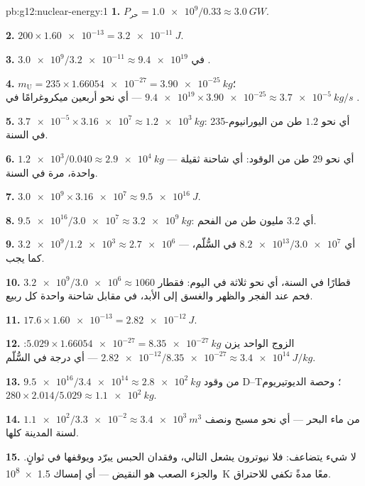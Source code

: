 \begin{solution}{pb:g12:nuclear-energy:1}
\textbf{1.} $P_{\text{حر}} = \num{1.0e9}/0.33 \approx \qty{3.0}{GW}$.

\textbf{2.} $200 \times \num{1.60e-13} = \qty{3.2e-11}{J}$.

\textbf{3.} $\num{3.0e9}/\num{3.2e-11} \approx \num{9.4e19}$ 
في .

\textbf{4.} $m_{\mathrm U} = 235 \times \num{1.66054e-27} =
\qty{3.90e-25}{kg}$؛ $\num{9.4e19} \times \num{3.90e-25} \approx
\qty{3.7e-5}{kg/s}$ --- أي نحو أربعين ميكروغرامًا في .

\textbf{5.} $\num{3.7e-5} \times \num{3.16e7} \approx \qty{1.2e3}{kg}$:
أي نحو $1.2$ طن من اليورانيوم-235 في السنة.

\textbf{6.} $\num{1.2e3}/0.040 \approx \qty{2.9e4}{kg}$ --- أي نحو $29$
طن من الوقود: أي شاحنة ثقيلة واحدة، مرة في السنة.

\textbf{7.} $\num{3.0e9} \times \num{3.16e7} \approx \qty{9.5e16}{J}$.

\textbf{8.} $\num{9.5e16}/\num{3.0e7} \approx \qty{3.2e9}{kg}$: أي $3.2$
مليون طن من الفحم.

\textbf{9.} $\num{3.2e9}/\num{1.2e3} \approx \num{2.7e6}$ --- أي
$\num{8.2e13}/\num{3.0e7}$ في السُّلّم، كما يجب.

\textbf{10.} $\num{3.2e9}/\num{3.0e6} \approx 1060$ قطارًا في السنة،
أي نحو ثلاثة في اليوم: فقطار فحم عند الفجر والظهر والغسق إلى الأبد،
في مقابل شاحنة واحدة كل ربيع.

\textbf{11.} $17.6 \times \num{1.60e-13} = \qty{2.82e-12}{J}$.

\textbf{12.} الزوج الواحد يزن $5.029 \times \num{1.66054e-27} =
\qty{8.35e-27}{kg}$: $\num{2.82e-12}/\num{8.35e-27} \approx
\qty{3.4e14}{J/kg}$ --- أي درجة  في السُّلّم.

\textbf{13.} $\num{9.5e16}/\num{3.4e14} \approx \qty{2.8e2}{kg}$ من
وقود D--T؛ وحصة الديوتيريوم $280 \times 2.014/5.029 \approx \qty{1.1e2}{kg}$.

\textbf{14.} $\num{1.1e2}/\num{3.3e-2} \approx \qty{3.4e3}{m^3}$ من
ماء البحر --- أي نحو مسبح ونصف لسنة المدينة كلها.

\textbf{15.} لا شيء يتضاعف: فلا نيوترون يشعل  التالي،
وفقدان الحبس يبرّد  ويوقفها في ثوانٍ.
والجزء الصعب هو النقيض --- أي إمساك \qty{1.5e8}{K} معًا مدةً
تكفي للاحتراق.


\end{solution}
